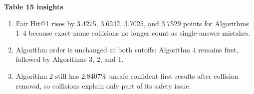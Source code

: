 \documentclass[11pt,a4paper]{article}
\begin{document}
\textbf{Table 15 insights}
\begin{enumerate}
  \item Fair Hit@1 rises by 3.4275, 3.6242, 3.7025, and 3.7529 points for
        Algorithms 1--4 because exact-name collisions no longer count as
        single-answer mistakes.
  \item Algorithm order is unchanged at both cutoffs: Algorithm 4 remains
        first, followed by Algorithms 3, 2, and 1.
  \item Algorithm 2 still has 2.8407\% unsafe confident first results after
        collision removal, so collisions explain only part of its safety issue.
\end{enumerate}
\end{document}

